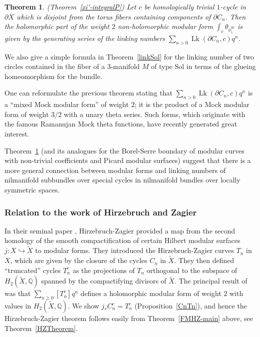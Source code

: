 \documentclass[12pt,leqno]{amsart}
\numberwithin{equation}{section}
\theoremstyle{plain}
\newtheorem{theorem}{Theorem}[section]
\theoremstyle{definition}
\theoremstyle{remark}
\newcommand{\Q}{\mathbb{Q}}
\newcommand{\Lk}{\operatorname{Lk}}
\begin{document}
\begin{theorem}\label{FM-linking} (Theorem~\ref{xi'-integralP})
Let $c$ be homologically trivial $1$-cycle in $\partial \overline{X}$ which
is disjoint from the torus fibers containing components of $\partial C_n$. Then the holomorphic part of the weight $2$ non-holomorphic modular form $\int_c \theta_{\phi_1^W}$ is given by the generating series of the linking numbers $\sum_{n>0}\Lk(\partial C_n,c) q^n$.
\end{theorem}

We also give a simple formula in Theorem~\ref{linkSol} for the linking number of two circles contained in the fiber of a $3$-manifold $M$ of type Sol in terms of the glueing homeomorphism for the bundle.

One can reformulate the previous theorem stating that $\sum_{n>0}\Lk(\partial C_n,c) q^n$ is a ``mixed Mock modular form'' of weight $2$; it is the product of a Mock modular form of weight $3/2$ with a unary theta series. Such forms, which originate with the famous Ramanujan Mock theta functions, have recently generated great interest. 

Theorem~\ref{FM-linking} (and its analogues for the Borel-Serre boundary of modular curves with non-trivial coefficients and Picard modular surfaces) suggest that there is a more general connection between modular forms and linking numbers of nilmanifold subbundles over special cycles in nilmanifold  bundles over locally symmetric spaces. 









\subsubsection*{Relation to the work of Hirzebruch and Zagier}

In their seminal paper \cite{HZ}, Hirzebruch-Zagier provided a map from the second homology of the smooth compactification of certain Hilbert modular surfaces $j:X \hookrightarrow \tilde{X}$ to modular forms. They introduced the Hirzebruch-Zagier curves $T_n$ in $X$, which are given by the closure of the cycles $C_n$ in $\tilde{X}$. They then defined ``truncated'' cycles $T_n^c$ as the
projections of $T_n$ orthogonal to the subspace of $H_2(\tilde{X},\Q)$ spanned by the 
compactifying divisors of $\tilde{X}$. The principal result of \cite{HZ} was that $\sum_{n \geq 0} [T_n^c] q^n$ defines a holomorphic modular form of weight $2$ with values in $H_2(\tilde{X},\Q)$.
We show $j_{\ast} C_n^c = T_n^c$ (Proposition~\ref{CnTn}), and hence the Hirzebruch-Zagier theorem follows easily from Theorem~\ref{FMHZ-main} above, see Theorem~\ref{HZTheorem}.
\end{document}
